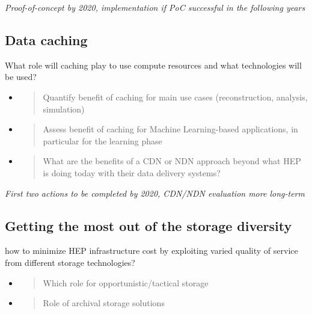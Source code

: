 \documentclass[12pt,a4paper]{article}
\begin{document}
\emph{Proof-of-concept by 2020, implementation if PoC successful in the following years}

\subsection{Data caching}\label{data-caching}
What role will
caching play to use compute resources and what technologies will be
used?

\begin{itemize}
\item
  \begin{quote}
  \protect\hypertarget{_z9tvlvkzecc1}{}{}Quantify benefit of caching for
  main use cases (reconstruction, analysis, simulation)
  \end{quote}
\item
  \begin{quote}
  \protect\hypertarget{_vyj6hh4exb5m}{}{}Assess benefit of caching for
  Machine Learning-based applications, in particular for the learning
  phase
  \end{quote}
\item
  \begin{quote}
  \protect\hypertarget{_ob8u0lfv3fum}{}{}What are the benefits of a CDN
  or NDN approach beyond what HEP is doing today with their data
  delivery systems?
  \end{quote}
\end{itemize}

\emph{First two actions to be completed by 2020, CDN/NDN evaluation more long-term}

\subsection{Getting the most out of the
storage diversity}\label{storage-diversity}
how to minimize HEP infrastructure cost by
exploiting varied quality of service from different storage
technologies?

\begin{itemize}
\item
  \begin{quote}
  \protect\hypertarget{_tmwkcbnhjw6g}{}{}Which role for
  opportunistic/tactical storage
  \end{quote}
\item
  \begin{quote}
  \protect\hypertarget{_tpsd2vti9z2o}{}{}Role of archival storage
  solutions
  \end{quote}
\end{itemize}
\end{document}
